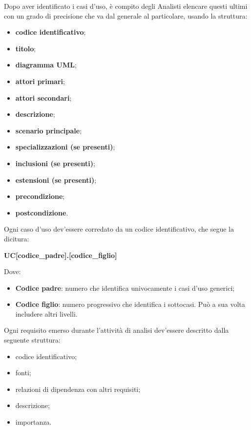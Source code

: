 		Dopo aver identificato i casi d'uso, è compito degli Analisti elencare questi ultimi con un grado di precisione che va dal generale al particolare, usando la struttura:
		\begin{itemize}
	    	\item{\textbf{codice identificativo}};
	    	\item{\textbf{titolo}};
	    	\item{\textbf{diagramma UML}};
	    	\item{\textbf{attori primari}};
	    	\item{\textbf{attori secondari}};
	    	\item{\textbf{descrizione}};
	    	\item{\textbf{scenario principale}};
    		\item{\textbf{specializzazioni (se presenti)}};
	    	\item{\textbf{inclusioni (se presenti)}};
	    	\item{\textbf{estensioni (se presenti)}};
	    	\item{\textbf{precondizione}};
	    	\item{\textbf{postcondizione}}.
		\end{itemize}

		\noindent Ogni caso d'uso dev'essere corredato da un codice identificativo, che segue la dicitura:
		\begin{center}
			\textbf{UC[codice\_padre].[codice\_figlio]}
		\end{center}

		\noindent Dove:
		\begin{itemize}
         	\item{\textbf{Codice padre}: numero che identifica univocamente i casi d'uso generici;}
         	\item{\textbf{Codice figlio}: numero progressivo che identifica i sottocasi. Può a sua volta includere altri livelli.}
		\end{itemize}

		Ogni requisito emerso durante l'attività di analisi dev'essere descritto dalla seguente struttura:
           	\begin{itemize}
                  	\item{codice identificativo;}
                  	\item{fonti;}
                  	\item{relazioni di dipendenza con altri requisiti;}
                  	\item{descrizione;}
                  	\item{importanza.}
    			\end{itemize}

